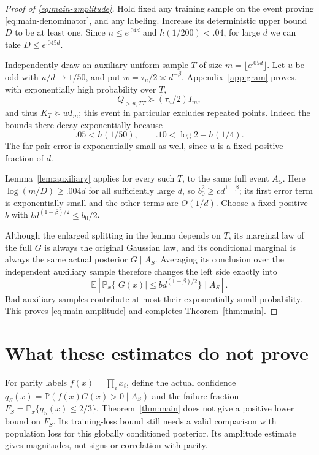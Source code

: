 \documentclass[11pt]{article}
\theoremstyle{remark}\newtheorem{remark}[theorem]{Remark}
\newcommand{\E}{\mathbb E}
\newcommand{\Pp}{\mathbb P}
\begin{document}
\begin{proof}[Proof of \eqref{eq:main-amplitude}]
Hold fixed any training sample on the event proving \eqref{eq:main-denominator}, and any labeling. Increase its deterministic upper bound $D$ to be at least one. Since $n\le e^{.04d}$ and $h(1/200)<.04$, for large $d$ we can take $D\le e^{.045d}$.

Independently draw an auxiliary uniform sample $T$ of size $m=\lfloor e^{.05d}\rfloor$. Let $u$ be odd with $u/d\to1/50$, and put $w=\tau_u/2\asymp d^{-\beta}$. Appendix~\ref{app:gram} proves, with exponentially high probability over $T$,
\[
 Q_{>u,TT}\succeq (\tau_u/2)I_m,
\]
and thus $K_T\succeq wI_m$; this event in particular excludes repeated points. Indeed the bounds there decay exponentially because
\[
 .05<h(1/50),\qquad .10<\log2-h(1/4).
\]
The far-pair error is exponentially small as well, since $u$ is a fixed positive fraction of $d$.

Lemma~\ref{lem:auxiliary} applies for every such $T$, to the same full event $A_S$. Here $\log(m/D)\ge .004d$ for all sufficiently large $d$, so $b_0^2\ge c d^{1-\beta}$; its first error term is exponentially small and the other terms are $O(1/d)$. Choose a fixed positive $b$ with $b d^{(1-\beta)/2}\le b_0/2$.

Although the enlarged splitting in the lemma depends on $T$, its marginal law of the full $G$ is always the original Gaussian law, and its conditional marginal is always the same actual posterior $G\mid A_S$. Averaging its conclusion over the independent auxiliary sample therefore changes the left side exactly into
\[
 \E[\Pp_x\{|G(x)|\le b d^{(1-\beta)/2}\}\mid A_S].
\]
Bad auxiliary samples contribute at most their exponentially small probability. This proves \eqref{eq:main-amplitude} and completes Theorem~\ref{thm:main}.
\end{proof}

\section{What these estimates do not prove}
For parity labels $f(x)=\prod_i x_i$, define the actual confidence $q_S(x)=\Pp(f(x)G(x)>0\mid A_S)$ and the failure fraction $F_S=\Pp_x\{q_S(x)\le2/3\}$. Theorem~\ref{thm:main} does not give a positive lower bound on $F_S$. Its training-loss bound still needs a valid comparison with population loss for this globally conditioned posterior. Its amplitude estimate gives magnitudes, not signs or correlation with parity.
\end{document}
